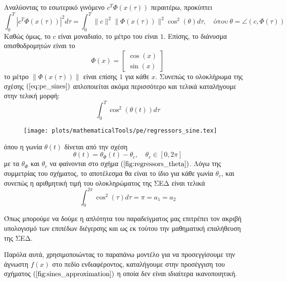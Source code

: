 Αναλύοντας το εσωτερικό γινόμενο $c^T \varPhi(x(\tau))$ περαιτέρω, προκύπτει
\begin{equation}
\int_{0}^{T} \left| c^T \varPhi(x(\tau)) \right|^2 d\tau = 
\int_{0}^{T} \|c\|^2 \| \varPhi(x(\tau)) \|^2 \cos^2(\theta) d\tau, \quad
\text{όπου} \: \theta = \angle (c, \varPhi(\tau))
\label{eq:pe_sines}
\end{equation}
Καθώς όμως, το $c$ είναι μοναδιαίο, το μέτρο του είναι $1$. Επίσης, το διάνυσμα οπισθοδρομητών είναι το
\begin{equation*}
	\varPhi(x) = \begin{bmatrix} \cos(x) \\ \sin(x) \end{bmatrix}
\end{equation*}
το μέτρο  $\| \varPhi(x(\tau)) \|$ είναι επίσης $1$ για κάθε $x$. Συνεπώς το ολοκλήρωμα της σχέσης $(\ref{eq:pe_sines})$ απλοποιείται ακόμα περισσότερο και τελικά καταλήγουμε στην τελική μορφή:
\begin{equation*}
	\int_{0}^{T}\cos^2(\theta(t)) d\tau
\end{equation*}
{
\begin{wrapfigure}{r}{0.4\textwidth}
	\centering
	\texttt{[image: plots/mathematicalTools/pe/regressors\_sine.tex]}
	\caption{}
	\label{fig:regressors_theta}	
\end{wrapfigure}
όπου η γωνία $\theta(t)$ δίνεται από την σχέση
\begin{equation*}
	\theta(t) = \theta_{\varPhi}(t) - \theta_c ,
	\quad \theta_c \in [0,2\pi]
\end{equation*}
με τα $\theta_{\varPhi}$ και $\theta_c$ να φαίνονται στο σχήμα $(\ref{fig:regressors_theta})$. Λόγω της συμμετρίας του σχήματος, το αποτέλεσμα θα είναι το ίδιο για κάθε γωνία $\theta_c$, και συνεπώς η αριθμητική τιμή του ολοκληρώματος της ΣΕΔ είναι τελικά
\begin{equation*}
\int_{0}^{2\pi}\cos^2(\tau) d\tau = \pi = a_1 = a_2
\end{equation*}

Όπως μπορούμε να δούμε η απλότητα του παραδείγματος μας επιτρέπει τον ακριβή υπολογισμό των επιπέδων διέγερσης και ως εκ τούτου την μαθηματική επαλήθευση της ΣΕΔ.

}

Παρόλα αυτά, χρησιμοποιώντας το παραπάνω μοντέλο για να προσεγγίσουμε την άγνωστη $f(x)$ στο πεδίο ενδιαφέροντος, καταλήγουμε στην προσέγγιση του σχήματος $(\ref{fig:sines_approximation})$ η οποία δεν είναι ιδιαίτερα ικανοποιητική.

